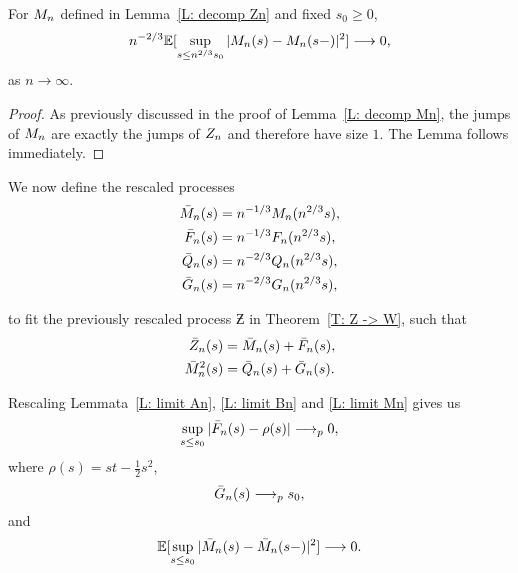 \begin{lemma} \label{L: limit Mn}
	For $M_n$ defined in Lemma~\ref{L: decomp Zn} and fixed $s_0 \geq 0$,
	\begin{equation} \label{E: limit Mn}
	n^{-2 / 3} \mathbb{E}[\sup_{s \leq n^{2 / 3} s_0 } |M_n(s) - M_n(s-)|^2] \longrightarrow 0,
	\end{equation}
	as $n\longrightarrow \infty$.
\end{lemma}

\begin{proof} \label{P: limit Mn}
	As previously discussed in the proof of Lemma~\ref{L: decomp Mn}, 
	the jumps of $M_n$ are exactly the jumps of $Z_n$ and therefore have size $1$. 
	The Lemma follows immediately.
\end{proof}


We now define the rescaled processes 
\begin{equation}
\begin{aligned}
\bar{M}_n(s) &= n^{-1 / 3}M_n(n^{2 / 3}s), \\
\bar{F}_n(s) &= n^{-1 / 3}F_n(n^{2 / 3}s), \\
\bar{Q}_n(s) &= n^{-2 / 3}Q_n(n^{2 / 3}s), \\
\bar{G}_n(s) &= n^{-2 / 3}G_n(n^{2 / 3}s),
\end{aligned} 	
\end{equation}

to fit the previously rescaled process 
$\Zbar$ in Theorem~\ref{T: Z -> W}, such that
\begin{equation}
\begin{aligned}
\bar{Z}_n(s) &= \bar{M}_n(s) + \bar{F}_n(s), \\
\bar{M}_n^2(s) &= \bar{Q}_n(s) + \bar{G}_n(s).
\end{aligned}	
\end{equation}

Rescaling Lemmata~\ref{L: limit An}, \ref{L: limit Bn} and \ref{L: limit Mn} gives us
\begin{equation} \label{E: limit An rescaled}
\sup_{s \leq s_0} |\bar{F}_n(s) - \rho (s)| \longrightarrow_p 0,
\end{equation}
where $\rho (s) = st - \frac{1}{2}s^2$,
\begin{equation} \label{E: limit Bn rescaled}
\bar{G}_n(s) \longrightarrow_p s_0,
\end{equation}
and
\begin{equation} \label{E: limit Mn rescaled}
\mathbb{E}[\sup_{s \leq s_0} | \bar{M}_n(s) - \bar{M}_n(s-) |^2 ] \longrightarrow 0.
\end{equation}

